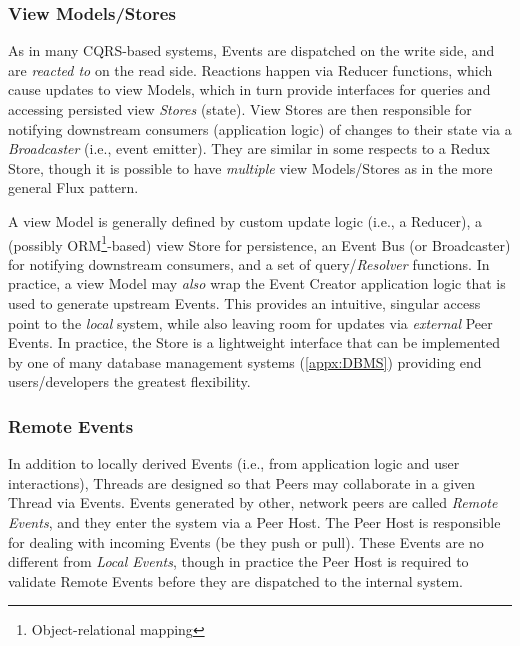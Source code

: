 \documentclass{textile}
\begin{document}

\subsubsection{View Models/Stores}\label{sec:views}

As in many CQRS-based systems, Events are dispatched on the write side, and are \emph{reacted to} on the read side. Reactions happen via Reducer functions, which cause updates to view Models, which in turn provide interfaces for queries and accessing persisted view \emph{Stores} (state). View Stores are then responsible for notifying downstream consumers (application logic) of changes to their state via a \emph{Broadcaster} (i.e., event emitter). They are similar in some respects to a Redux Store, though it is possible to have \emph{multiple} view Models/Stores as in the more general Flux pattern.

A view Model is generally defined by custom update logic (i.e., a Reducer), a (possibly ORM\footnote{Object-relational mapping}-based) view Store for persistence, an Event Bus (or Broadcaster) for notifying downstream consumers, and a set of query/\emph{Resolver} \cite{ereminReduxInspiredBackend2019} functions. In practice, a view Model may \emph{also} wrap the Event Creator application logic that is used to generate upstream Events. This provides an intuitive, singular access point to the \emph{local} system, while also leaving room for updates via \emph{external} Peer Events. In practice, the Store is a lightweight interface that can be implemented by one of many database management systems (\ref{appx:DBMS}) providing end users/developers the greatest flexibility.

\subsubsection{Remote Events}\label{sec:external}

In addition to locally derived Events (i.e., from application logic and user interactions), Threads are designed so that Peers may collaborate in a given Thread via Events. Events generated by other, network peers are called \emph{Remote Events}, and they enter the system via a Peer Host. The Peer Host is responsible for dealing with incoming Events (be they push or pull). These Events are no different from \emph{Local Events}, though in practice the Peer Host is required to validate Remote Events before they are dispatched to the internal system.
\end{document}
